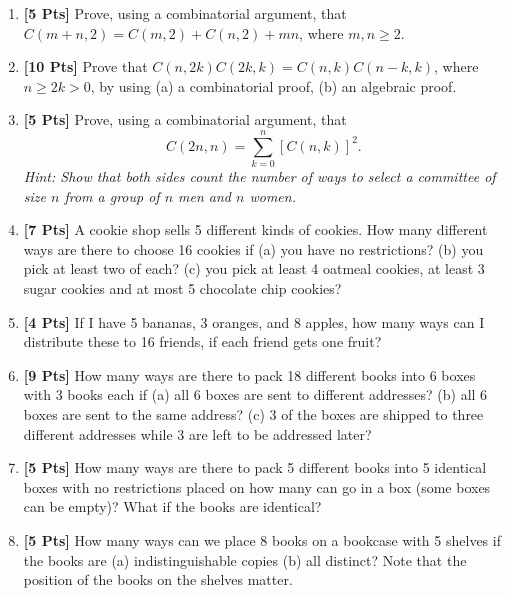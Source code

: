 \documentclass[11pt]{article}
\begin{document}
\begin{enumerate}

\item {\bf [5 Pts]} Prove, using a combinatorial argument, that $C(m+n, 2) = C(m,2) + C(n,2) + mn$, where $m,n \geq 2$. 

\item {\bf [10 Pts]} Prove that $C(n,2k) C(2k,k) = C(n,k) C(n-k,k)$, where 
$n \geq 2k > 0$, by using (a) a combinatorial proof, (b) an algebraic proof.

\item {\bf [5 Pts]} Prove, using a combinatorial argument, that 
$$C(2n, n) = \sum^n_{k = 0} [C(n,k)]^2.$$
{\it Hint: Show that both sides count the number of ways to select a committee of size $n$ from a group of $n$ men and $n$ women.}

\item {\bf [7 Pts]} A cookie shop  sells 5 different kinds of cookies. How many different ways are there to choose 16 cookies if (a) you have no restrictions? (b) you pick at least two of each? (c) you pick at least 4 oatmeal cookies, at least 3 sugar cookies and at most 5 chocolate chip cookies? 

\item {\bf [4 Pts]} If I have 5 bananas, 3 oranges, and 8 apples, how many ways can I distribute these to 16 friends, if each friend gets one fruit?

\item {\bf [9 Pts]} How many ways are there to pack 18 different books into 6 boxes with 3 books each if (a) all 6 boxes are sent to different addresses? (b) all 6 boxes are sent to the same address? (c) 3 of the boxes are shipped to three different addresses while 3 are left to be addressed later? 

\item {\bf [5 Pts]} How many ways are there to pack 5 different books into 5 identical boxes with no restrictions placed on how many can go in a box (some boxes can be empty)? What if the books are identical?

\item {\bf [5 Pts]} How many ways can we place 8 books on a bookcase with 5 shelves if the books are (a) indistinguishable copies (b) all distinct? Note that the position of the books on the shelves matter.

\end{enumerate}
\end{document}
